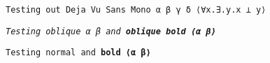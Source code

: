 \documentclass{article}
\begin{document}
\begin{verbatim}
Testing out Deja Vu Sans Mono α β γ δ ⟨∀x.∃.y.x ⊥ y⟩
\end{verbatim}

\textsl{\texttt{Testing oblique α β and \textbf{oblique bold ⟨α β⟩}}}

\texttt{Testing normal and \textbf{bold ⟨α β⟩}}
\end{document}
